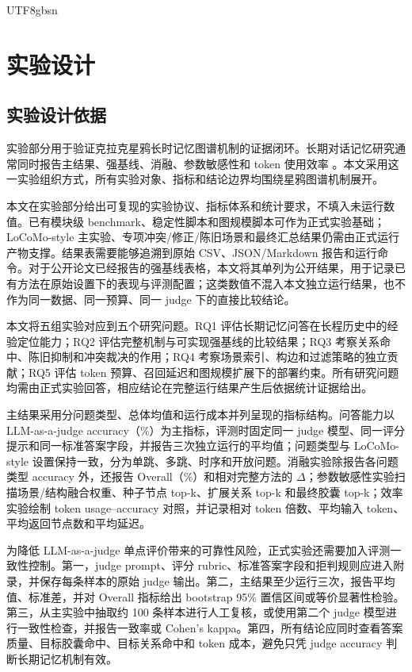 \documentclass[a4paper,fleqn]{cas-sc}
\begin{document}
\begin{CJK*}{UTF8}{gbsn}
\section{实验设计}

\subsection{实验设计依据}

实验部分用于验证克拉克星鸦长时记忆图谱机制的证据闭环。长期对话记忆研究通常同时报告主结果、强基线、消融、参数敏感性和 token 使用效率 \citep{maharana2024locomo,yue2026hypermem}。本文采用这一实验组织方式，所有实验对象、指标和结论边界均围绕星鸦图谱机制展开。

本文在实验部分给出可复现的实验协议、指标体系和统计要求，不填入未运行数值。已有模块级 benchmark、稳定性脚本和图规模脚本可作为正式实验基础；LoCoMo-style 主实验、专项冲突/修正/陈旧场景和最终汇总结果仍需由正式运行产物支撑。结果表需要能够追溯到原始 CSV、JSON/Markdown 报告和运行命令。对于公开论文已经报告的强基线表格，本文将其单列为公开结果，用于记录已有方法在原始设置下的表现与评测配置；这类数值不混入本文独立运行结果，也不作为同一数据、同一预算、同一 judge 下的直接比较结论。

本文将五组实验对应到五个研究问题。RQ1 评估长期记忆问答在长程历史中的经验定位能力；RQ2 评估完整机制与可实现强基线的比较结果；RQ3 考察关系命中、陈旧抑制和冲突裁决的作用；RQ4 考察场景索引、构边和过滤策略的独立贡献；RQ5 评估 token 预算、召回延迟和图规模扩展下的部署约束。所有研究问题均需由正式实验回答，相应结论在完整运行结果产生后依据统计证据给出。

主结果采用分问题类型、总体均值和运行成本并列呈现的指标结构。问答能力以 LLM-as-a-judge accuracy（\%）为主指标，评测时固定同一 judge 模型、同一评分提示和同一标准答案字段，并报告三次独立运行的平均值；问题类型与 LoCoMo-style 设置保持一致，分为单跳、多跳、时序和开放问题。消融实验除报告各问题类型 accuracy 外，还报告 Overall（\%）和相对完整方法的 $\Delta$；参数敏感性实验扫描场景/结构融合权重、种子节点 top-k、扩展关系 top-k 和最终胶囊 top-k；效率实验绘制 token usage--accuracy 对照，并记录相对 token 倍数、平均输入 token、平均返回节点数和平均延迟。

为降低 LLM-as-a-judge 单点评价带来的可靠性风险，正式实验还需要加入评测一致性控制。第一，judge prompt、评分 rubric、标准答案字段和拒判规则应进入附录，并保存每条样本的原始 judge 输出。第二，主结果至少运行三次，报告平均值、标准差，并对 Overall 指标给出 bootstrap 95\% 置信区间或等价显著性检验。第三，从主实验中抽取约 100 条样本进行人工复核，或使用第二个 judge 模型进行一致性检查，并报告一致率或 Cohen's kappa。第四，所有结论应同时查看答案质量、目标胶囊命中、目标关系命中和 token 成本，避免只凭 judge accuracy 判断长期记忆机制有效。


\end{CJK*}
\end{document}
